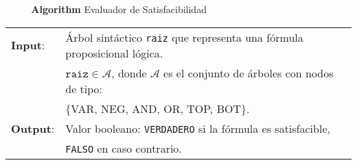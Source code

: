 \documentclass{article}
\begin{document}
~~~
\newline
~
\newline
\newline
\textbf{Algorithm} Evaluador de Satisfacibilidad
\newline
\newline

\begin{tabular}{l l}
\textbf{Input}:  & Árbol sintáctico \texttt{raiz} que representa una fórmula proposicional lógica. \\
                 & $\texttt{raiz} \in \mathcal{A}$, donde $\mathcal{A}$ es el conjunto de árboles con nodos de tipo: \\
                 & $\{$VAR, NEG, AND, OR, TOP, BOT$\}$. \\
\textbf{Output}: & Valor booleano: \texttt{VERDADERO} si la fórmula es satisfacible, \\
                 & \texttt{FALSO} en caso contrario. \\
\end{tabular}
~~
\newline
\end{document}
